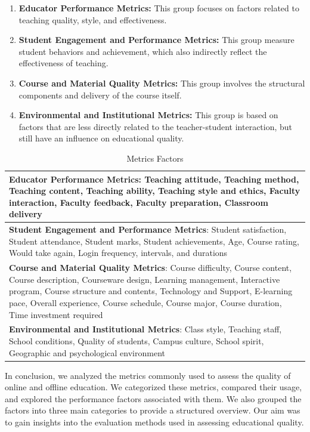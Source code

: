 \documentclass{svproc}
\begin{document}
\begin{enumerate}
    \item \textbf{Educator Performance Metrics:} This group focuses on factors related to teaching quality, style, and effectiveness.
    \item \textbf{Student Engagement and Performance Metrics:} This group measure student behaviors and achievement, which also indirectly reflect the effectiveness of teaching.
    \item \textbf{Course and Material Quality Metrics:} This group involves the structural components and delivery of the course itself.
    \item \textbf{Environmental and Institutional Metrics:} This group is based on factors that are less directly related to the teacher-student interaction, but still have an influence on educational quality.
\end{enumerate}



\begin{table}[h]
\caption{Metrics Factors}
\label{Metrics factors}
\begin{tabular}{p{}}
\hline
\textbf{Educator Performance Metrics}: Teaching attitude, Teaching method, Teaching content, Teaching ability, Teaching style and ethics, Faculty interaction, Faculty feedback, Faculty preparation, Classroom delivery \\
\hline
\textbf{Student Engagement and Performance Metrics}: Student satisfaction, Student attendance, Student marks, Student achievements, Age, Course rating, Would take again, Login frequency, intervals, and durations \\
\hline
\textbf{Course and Material Quality Metrics}: Course difficulty, Course content, Course description, Courseware design, Learning management, Interactive program, Course structure and contents, Technology and Support, E-learning pace, Overall experience, Course schedule, Course major, Course duration, Time investment required \\
\hline
\textbf{Environmental and Institutional Metrics}: Class style, Teaching staff, School conditions, Quality of students, Campus culture, School spirit, Geographic and psychological environment \\
\hline
\end{tabular}
\end{table}



In conclusion, we analyzed the metrics commonly used to assess the quality of online and offline education. We categorized these metrics, compared their usage, and explored the performance factors associated with them. We also grouped the factors into three main categories to provide a structured overview. Our aim was to gain insights into the evaluation methods used in assessing educational quality.
\end{document}
